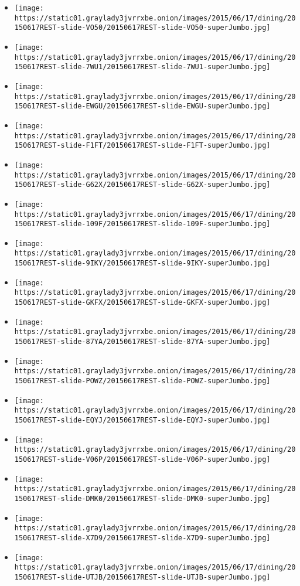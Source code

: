 \begin{itemize}
\item
  \texttt{[image: https://static01.graylady3jvrrxbe.onion/images/2015/06/17/dining/20150617REST-slide-VO50/20150617REST-slide-VO50-superJumbo.jpg]}
\item
  \texttt{[image: https://static01.graylady3jvrrxbe.onion/images/2015/06/17/dining/20150617REST-slide-7WU1/20150617REST-slide-7WU1-superJumbo.jpg]}
\item
  \texttt{[image: https://static01.graylady3jvrrxbe.onion/images/2015/06/17/dining/20150617REST-slide-EWGU/20150617REST-slide-EWGU-superJumbo.jpg]}
\item
  \texttt{[image: https://static01.graylady3jvrrxbe.onion/images/2015/06/17/dining/20150617REST-slide-F1FT/20150617REST-slide-F1FT-superJumbo.jpg]}
\item
  \texttt{[image: https://static01.graylady3jvrrxbe.onion/images/2015/06/17/dining/20150617REST-slide-G62X/20150617REST-slide-G62X-superJumbo.jpg]}
\item
  \texttt{[image: https://static01.graylady3jvrrxbe.onion/images/2015/06/17/dining/20150617REST-slide-109F/20150617REST-slide-109F-superJumbo.jpg]}
\item
  \texttt{[image: https://static01.graylady3jvrrxbe.onion/images/2015/06/17/dining/20150617REST-slide-9IKY/20150617REST-slide-9IKY-superJumbo.jpg]}
\item
  \texttt{[image: https://static01.graylady3jvrrxbe.onion/images/2015/06/17/dining/20150617REST-slide-GKFX/20150617REST-slide-GKFX-superJumbo.jpg]}
\item
  \texttt{[image: https://static01.graylady3jvrrxbe.onion/images/2015/06/17/dining/20150617REST-slide-87YA/20150617REST-slide-87YA-superJumbo.jpg]}
\item
  \texttt{[image: https://static01.graylady3jvrrxbe.onion/images/2015/06/17/dining/20150617REST-slide-POWZ/20150617REST-slide-POWZ-superJumbo.jpg]}
\item
  \texttt{[image: https://static01.graylady3jvrrxbe.onion/images/2015/06/17/dining/20150617REST-slide-EQYJ/20150617REST-slide-EQYJ-superJumbo.jpg]}
\item
  \texttt{[image: https://static01.graylady3jvrrxbe.onion/images/2015/06/17/dining/20150617REST-slide-V06P/20150617REST-slide-V06P-superJumbo.jpg]}
\item
  \texttt{[image: https://static01.graylady3jvrrxbe.onion/images/2015/06/17/dining/20150617REST-slide-DMK0/20150617REST-slide-DMK0-superJumbo.jpg]}
\item
  \texttt{[image: https://static01.graylady3jvrrxbe.onion/images/2015/06/17/dining/20150617REST-slide-X7D9/20150617REST-slide-X7D9-superJumbo.jpg]}
\item
  \texttt{[image: https://static01.graylady3jvrrxbe.onion/images/2015/06/17/dining/20150617REST-slide-UTJB/20150617REST-slide-UTJB-superJumbo.jpg]}
\end{itemize}

